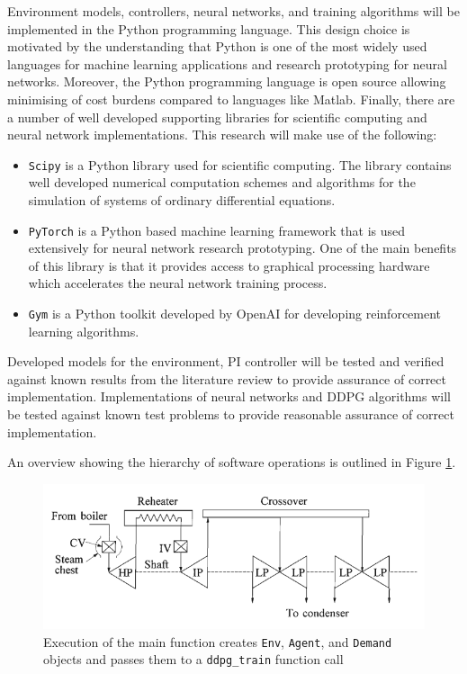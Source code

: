 Environment models, controllers, neural networks, and training algorithms will be implemented in the Python programming language. This design choice is motivated by the understanding that Python is one of the most widely used languages for machine learning applications and research prototyping for neural networks. Moreover, the Python programming language is open source allowing minimising of cost burdens compared to languages like Matlab. Finally, there are a number of well developed supporting libraries for scientific computing and neural network implementations. This research will make use of the following:
\begin{itemize}
	\item \texttt{Scipy} is a Python library used for scientific computing. The library contains well developed numerical computation schemes and algorithms for the simulation of systems of ordinary differential equations.
	\item \texttt{PyTorch} is a Python based machine learning framework that is used extensively for neural network research prototyping. One of the main benefits of this library is that it provides access to graphical processing hardware which accelerates the neural network training process.
	\item \texttt{Gym} is a Python toolkit developed by OpenAI for developing reinforcement learning algorithms.
\end{itemize}

Developed models for the environment, PI controller will be tested and verified against known results from the literature review to provide assurance of correct implementation. Implementations of neural networks and DDPG algorithms will be tested against known test problems to provide reasonable assurance of correct implementation.

An overview showing the hierarchy of software operations is outlined in Figure \ref{fig:software_implementation}.
\begin{figure}[h]
	\centering
	\includegraphics[scale=0.6]{./figures/A03_turbine_configuration}
	\caption{Execution of the main function creates \texttt{Env}, \texttt{Agent}, and \texttt{Demand} objects and passes them to a \texttt{ddpg\_train} function call}
	\label{fig:software_implementation}
\end{figure}